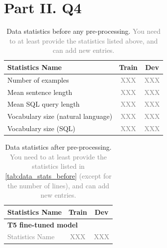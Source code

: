 \documentclass{article}
\begin{document}
\section*{Part II. Q4}
% 


\begin{table}[h!]
\centering
\begin{tabular}{lcc}
\toprule
Statistics Name & Train & Dev \\
\midrule
Number of examples & \textcolor{gray}{XXX} & \textcolor{gray}{XXX} \\
Mean sentence length & \textcolor{gray}{XXX}& \textcolor{gray}{XXX} \\
Mean SQL query length & \textcolor{gray}{XXX}& \textcolor{gray}{XXX}  \\
Vocabulary size (natural language)& \textcolor{gray}{XXX}& \textcolor{gray}{XXX}  \\
Vocabulary size (SQL)& \textcolor{gray}{XXX}& \textcolor{gray}{XXX}  \\
\bottomrule
\end{tabular}
\caption{Data statistics before any pre-processing. \textcolor{gray}{You need to at least provide the statistics listed above, and can add new entries.}}
\label{tab:data_stats_before}
\end{table}

\begin{table}[h!]
\centering
\begin{tabular}{lcc}
\toprule
Statistics Name & Train & Dev \\
\midrule
\multicolumn{3}{l}{\textbf{T5 fine-tuned model}} \\ %
\textcolor{gray}{Statistics Name} & \textcolor{gray}{XXX}& \textcolor{gray}{XXX} \\
\midrule
\bottomrule
\end{tabular}
\caption{Data statistics after pre-processing. \textcolor{gray}{You need to at least provide the statistics listed in \autoref{tab:data_stats_before} (except for the number of lines), and can add new entries.}}
\label{tab:data_stats_after}
\end{table}



\newpage
\end{document}
